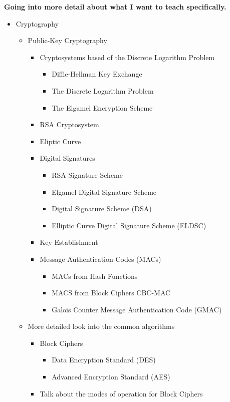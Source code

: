 \textbf{Going into more detail about what I want to teach specifically.}
\begin{itemize} %
\item{Cryptography
\begin{itemize}
\item{Public-Key Cryptography
\begin{itemize}
\item{Cryptosystems based of the Discrete Logarithm Problem
\begin{itemize}
\item{Diffie-Hellman Key Exchange}
\item{The Discrete Logarithm Problem}
\item{The Elgamel Encryption Scheme}
\end{itemize}}
\item{RSA Cryptosystem}
\item{Eliptic Curve}
\item{Digital Signatures
\begin{itemize}
\item{RSA Signature Scheme}
\item{Elgamel Digital Signature Scheme}
\item{Digital Signature Scheme (DSA)}
\item{Elliptic Curve Digital Signature Scheme (ELDSC)}
\end{itemize}}
\item{Key Establishment}
\item{Message Authentication Codes (MACs)
\begin{itemize}
\item{MACs from Hash Functions}
\item{MACS from Block Ciphers CBC-MAC}
\item{Galois Counter Message Authentication Code (GMAC)}
\end{itemize}}
\end{itemize}}
\item{More detailed look into the common algorithms
\begin{itemize}
\item{Block Ciphers
\begin{itemize}
\item{Data Encryption Standard (DES)}
\item{Advanced Encryption Standard (AES)}
\end{itemize}}
\item{Talk about the modes of operation for Block Ciphers
}
\end{itemize}}
\end{itemize}}
\end{itemize}
